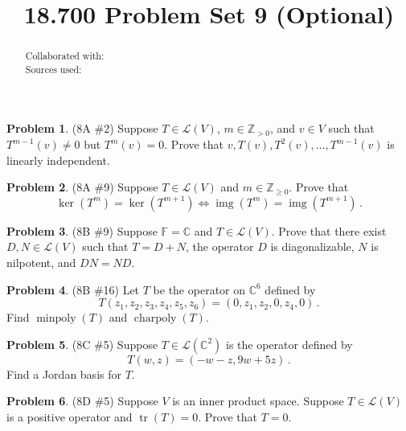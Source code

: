 \documentclass[reqno, 12pt]{amsart}
\theoremstyle{definition}
\newenvironment{problab}[1]
{\noindent\textbf{Problem #1}.}
{\vskip 6pt}
\theoremstyle{remark}
\newtheorem*{soln}{Solution}
\newcommand{\C}{\mathbb C}
\newcommand{\F}{\mathbb F}
\newcommand{\Z}{\mathbb Z}
\renewcommand{\L}{\mathcal L}
\DeclareMathOperator{\img}{img}
\DeclareMathOperator{\tr}{tr}
\DeclareMathOperator{\minpoly}{minpoly}
\DeclareMathOperator{\charpoly}{charpoly}
\renewcommand{\abstractname}{}    %
\begin{document}

\title{18.700 Problem Set 9 (Optional)}

\maketitle

\begin{abstract}
  \noindent Collaborated with:\\
  Sources used: 
\end{abstract}
\vskip 0.5cm


\begin{problab}{1} (8A \#2) %
  Suppose $T \in \L(V)$, $m \in \Z_{>0}$, and $v \in V$ such that $T^{m-1}(v) \neq 0$ but $T^m(v) = 0$. Prove that $v, T(v), T^2(v), \ldots, T^{m-1}(v)$ is linearly independent.
\end{problab}


\begin{problab}{2} (8A \#9) %
  Suppose $T \in \L(V)$ and $m \in \Z_{\geq 0}$. Prove that \begin{equation*}
    \ker(T^m) = \ker(T^{m+1}) \iff \img(T^m) = \img(T^{m+1}) \, .
  \end{equation*}
\end{problab}

\begin{problab}{3} (8B \#9) %
  Suppose $\F = \C$ and $T \in \L(V)$. Prove that there exist $D, N \in \L(V)$ such that $T = D + N$, the operator $D$ is diagonalizable, $N$ is nilpotent, and $DN = ND$.
\end{problab}

\begin{problab}{4} (8B \#16) %
  Let $T$ be the operator on $\C^6$ defined by
  \begin{equation*}
    T(z_1, z_2, z_3, z_4, z_5, z_6) = (0, z_1, z_2, 0, z_4, 0) \, .
  \end{equation*}
  Find $\minpoly(T)$ and $\charpoly(T)$.
\end{problab}

\begin{problab}{5} (8C \#5) %
  Suppose $T \in \L(\C^2)$ is the operator defined by
  \begin{equation*}
    T(w,z) = (-w - z, 9w + 5z) \, .
  \end{equation*}
  Find a Jordan basis for $T$.
\end{problab}

\begin{problab}{6} (8D \#5) %
  Suppose $V$ is an inner product space. Suppose $T \in \L(V)$ is a positive operator and $\tr(T) = 0$. Prove that $T = 0$.
\end{problab}
\end{document}
